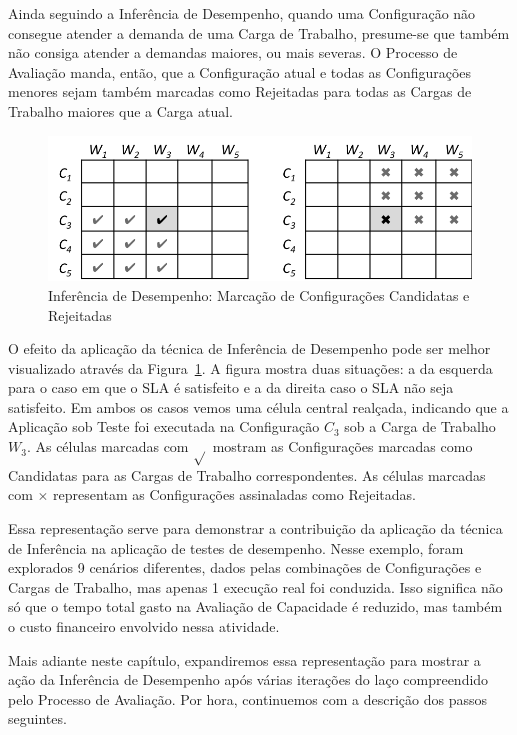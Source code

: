 Ainda seguindo a Inferência de Desempenho, quando uma Configuração não consegue
atender a demanda de uma Carga de Trabalho, presume-se que também não consiga
atender a demandas maiores, ou mais severas. O Processo de Avaliação manda, então,
que a Configuração atual e todas as Configurações menores sejam também marcadas
como Rejeitadas para todas as Cargas de Trabalho maiores que a Carga atual. 

\begin{figure}
  \caption{\label{fig:fig_processo_inferencia}Inferência de Desempenho: Marcação de Configurações Candidatas e Rejeitadas}
  \begin{center}
    \includegraphics[scale=1]{img/inference}
  \end{center}
\end{figure}

O efeito da aplicação da técnica de Inferência de Desempenho pode ser melhor
visualizado através da Figura~\ref{fig:fig_processo_inferencia}. A figura mostra 
duas situações: a da esquerda para o caso em que o SLA é satisfeito e a da direita 
caso o SLA não seja satisfeito. Em ambos os casos vemos uma célula central realçada, 
indicando que a Aplicação sob Teste foi executada na Configuração $C_3$ sob a 
Carga de Trabalho $W_3$. As células marcadas com $\sqrt{}$ mostram as Configurações
marcadas como Candidatas para as Cargas de Trabalho correspondentes. As células
marcadas com $\times{}$ representam as Configurações assinaladas como Rejeitadas.

Essa representação serve para demonstrar a contribuição da aplicação da técnica 
de Inferência na aplicação de testes de desempenho. Nesse exemplo, foram 
explorados 9 cenários diferentes, dados pelas combinações de Configurações e 
Cargas de Trabalho, mas apenas 1 execução real foi conduzida. Isso significa não
só que o tempo total gasto na Avaliação de Capacidade é reduzido, mas também o
custo financeiro envolvido nessa atividade. 

Mais adiante neste capítulo, expandiremos essa representação para mostrar a ação
da Inferência de Desempenho após várias iterações do laço compreendido pelo 
Processo de Avaliação. Por hora, continuemos com a descrição dos passos seguintes.

